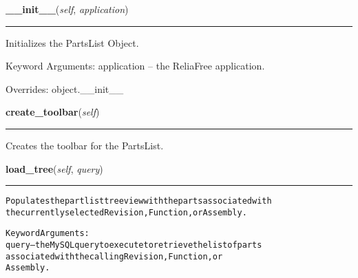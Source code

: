 \hspace{.8\funcindent}\begin{boxedminipage}{\funcwidth}

    \raggedright \textbf{\_\_init\_\_}(\textit{self}, \textit{application})

    \vspace{-1.5ex}

    \rule{\textwidth}{0.5\fboxrule}
\setlength{\parskip}{2ex}
    Initializes the PartsList Object.

    Keyword Arguments: application -- the ReliaFree application.

\setlength{\parskip}{1ex}
      Overrides: object.\_\_init\_\_

    \end{boxedminipage}

    \label{reliafree:partlist:PartsListWindow:create_toolbar}

    \vspace{0.5ex}

\hspace{.8\funcindent}\begin{boxedminipage}{\funcwidth}

    \raggedright \textbf{create\_toolbar}(\textit{self})

    \vspace{-1.5ex}

    \rule{\textwidth}{0.5\fboxrule}
\setlength{\parskip}{2ex}
    Creates the toolbar for the PartsList.

\setlength{\parskip}{1ex}
    \end{boxedminipage}

    \label{reliafree:partlist:PartsListWindow:load_tree}

    \vspace{0.5ex}

\hspace{.8\funcindent}\begin{boxedminipage}{\funcwidth}

    \raggedright \textbf{load\_tree}(\textit{self}, \textit{query})

    \vspace{-1.5ex}

    \rule{\textwidth}{0.5\fboxrule}
\setlength{\parskip}{2ex}
\begin{alltt}
Populates the part list treeview with the parts associated with
the currently selected Revision, Function, or Assembly.

Keyword Arguments:
query -- the MySQL query to execute to retrieve the list of parts
         associated with the calling Revision, Function, or
         Assembly.
\end{alltt}

\setlength{\parskip}{1ex}
    \end{boxedminipage}

